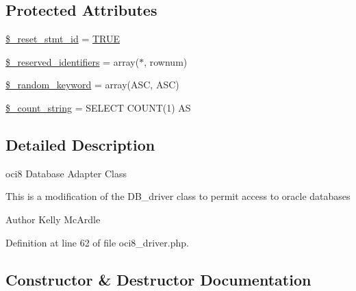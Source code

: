 \subsection*{Protected Attributes}
\begin{DoxyCompactItemize}
\item 
\mbox{\hyperlink{class_c_i___d_b__oci8__driver_ad21690f62001483fa1d13b9ee6143923}{\$\+\_\+reset\+\_\+stmt\+\_\+id}} = \mbox{\hyperlink{constants_8php_ae04a3efe6aa42044f803ee90c2277846}{T\+R\+UE}}
\item 
\mbox{\hyperlink{class_c_i___d_b__oci8__driver_aa3298c4c62fbee8bb09f1b75b633fb0d}{\$\+\_\+reserved\+\_\+identifiers}} = array(\textquotesingle{}$\ast$\textquotesingle{}, \textquotesingle{}rownum\textquotesingle{})
\item 
\mbox{\hyperlink{class_c_i___d_b__oci8__driver_a10213aa6e05f6d924d3277bb1d2fea00}{\$\+\_\+random\+\_\+keyword}} = array(\textquotesingle{}A\+SC\textquotesingle{}, \textquotesingle{}A\+SC\textquotesingle{})
\item 
\mbox{\hyperlink{class_c_i___d_b__oci8__driver_a06c80bac2ecbd0557827e96949c23097}{\$\+\_\+count\+\_\+string}} = \textquotesingle{}S\+E\+L\+E\+CT C\+O\+U\+NT(1) AS \textquotesingle{}
\end{DoxyCompactItemize}


\subsection{Detailed Description}
oci8 Database Adapter Class

This is a modification of the D\+B\+\_\+driver class to permit access to oracle databases

\begin{DoxyAuthor}{Author}
Kelly Mc\+Ardle 
\end{DoxyAuthor}


Definition at line 62 of file oci8\+\_\+driver.\+php.



\subsection{Constructor \& Destructor Documentation}
\mbox{\label{class_c_i___d_b__oci8__driver_a9162320adff1a1a4afd7f2372f753a3e}} 
